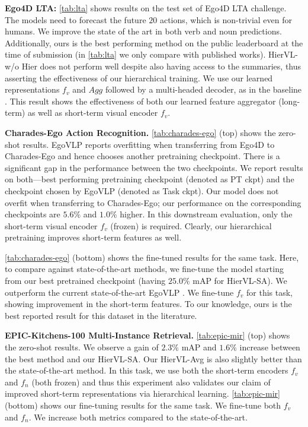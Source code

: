 \documentclass[10pt,twocolumn,letterpaper]{article}
\newcommand{\modelname}[0]{{HierVL}}
\begin{document}
\vspace*{0.15in}
\textbf{Ego4D LTA:} \cref{tab:lta} shows results on the test set of Ego4D LTA challenge. 
The models need to forecast the future $20$ actions, which is non-trivial even for humans. We improve the state of the art in both verb and noun predictions. Additionally, ours is the best performing method on the public leaderboard at the time of submission  (in \cref{tab:lta} we only compare with published works).    \modelname-w/o Hier does not perform well despite also having access to the summaries, thus asserting the effectiveness of our hierarchical training. 
We use our learned representations $f_v$ and $Agg$ followed by a multi-headed decoder, as in the baseline \cite{ego4d}.
This result shows the effectiveness of both our learned feature aggregator (long-term) as well as short-term visual encoder $f_v$.







\textbf{Charades-Ego Action Recognition.}
 \cref{tab:charades-ego} (top) shows the zero-shot results.
EgoVLP \cite{egovlp} reports overfitting when transferring from Ego4D to Charades-Ego and hence chooses another pretraining checkpoint. There is a significant gap in the performance between the two checkpoints. We report results on both---best performing pretraining checkpoint (denoted as PT ckpt) and the checkpoint chosen by EgoVLP (denoted as Task ckpt). Our model does not overfit when transferring to Charades-Ego; our performance on the corresponding checkpoints are $5.6\%$ and $1.0\%$ higher. In this downstream evaluation, only the short-term visual encoder $f_v$ (frozen) is required. Clearly, our hierarchical pretraining improves short-term features as well.



\cref{tab:charades-ego} (bottom) shows the fine-tuned results for the same task.  Here, to compare against state-of-the-art methods, we fine-tune the model starting from our best pretrained checkpoint (having $25.0\%$ mAP for \modelname-SA). We outperform the current state-of-the-art EgoVLP \cite{egovlp}. We fine-tune $f_v$ for this task, showing improvement in the short-term features.  To our knowledge, ours is the best reported result for this dataset in the literature. 

\textbf{EPIC-Kitchens-100 Multi-Instance Retrieval.} 
\cref{tab:epic-mir} (top) shows the zero-shot results.
We observe a gain of $2.3\%$ mAP and $1.6\%$ increase between the best method and our \modelname-SA. Our \modelname-Avg is also slightly better than the state-of-the-art method. In this task, we use both the short-term encoders $f_v$ and $f_n$ (both frozen) and thus this experiment also validates our claim of improved short-term representations via hierarchical learning.  \cref{tab:epic-mir} (bottom) shows our fine-tuning results for the same task. 
We fine-tune both $f_v$ and $f_n$.
We increase both metrics  compared to the state-of-the-art. 
\end{document}
